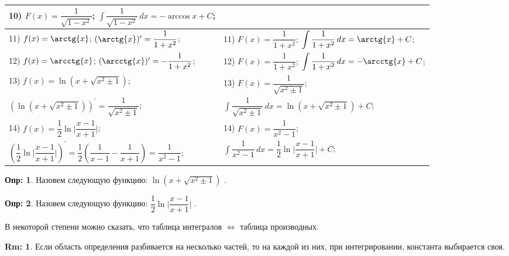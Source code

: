 \documentclass[12pt]{article}
\theoremstyle{definition}
\newtheorem{defn}{Опр:}
\newtheorem{rem}{Rm:}
\DeclareMathOperator{\dint}{\displaystyle\int}
\begin{document}
\begin{tabular}{|p{}|p{}|}
	\rule{0pt}{4.2ex}10) $F(x) = \dfrac{1}{\sqrt{1-x^2}}$; $\dint \dfrac{1}{\sqrt{1-x^2}} \, dx = -\arccos{x} + C$;
	\\[2ex]\hline
	\rule{0pt}{4.2ex}11) $f(x) = \arctg{x}$; $(\arctg{x})^\prime = \dfrac{1}{1 + x^2}$; & 
	\rule{0pt}{4.2ex}11) $F(x) = \dfrac{1}{1 + x^2}$; $\dint \dfrac{1}{1 + x^2} \, dx = \arctg{x} + C$;
	\\[2ex]\hline
	\rule{0pt}{4.2ex}12) $f(x) = \arcctg{x}$; $(\arcctg{x})^\prime = -\dfrac{1}{1 + x^2}$; & 
	\rule{0pt}{4.2ex}12) $F(x) = \dfrac{1}{1 + x^2}$; $\dint \dfrac{1}{1 + x^2} \, dx = -\arcctg{x} + C$;
	\\[2ex]\hline
	
	\rule{0pt}{4.2ex}13) $f(x) = \ln\left(x+\sqrt{x^2\pm 1}\right)$; & 
	\rule{0pt}{4.2ex}13) $F(x) = \dfrac{1}{\sqrt{x^2\pm 1}}$; 
	\\[2ex]
	\vphantom{13)} $\left(\ln\left(x+\sqrt{x^2\pm 1}\right)\right)^\prime =\dfrac{1}{\sqrt{x^2\pm 1}}$; &
	\vphantom{13)} $\dint \dfrac{1}{\sqrt{x^2\pm 1}} \, dx = \ln\left(x+\sqrt{x^2\pm 1}\right) + C$;
	\\[2ex]\hline
	
	\rule{0pt}{4.2ex}14) $f(x) = \dfrac{1}{2}\ln \bigg|\dfrac{x-1}{x+1}\bigg|$; & 
	\rule{0pt}{4.2ex}14) $F(x) = \dfrac{1}{x^2-1}$; 
	\\[2ex]
	\vphantom{14)} $\left(\dfrac{1}{2}\ln \bigg|\dfrac{x-1}{x+1}\bigg|\right)^\prime =\dfrac{1}{2}\left(\dfrac{1}{x-1} - \dfrac{1}{x+1} \right) = \dfrac{1}{x^2-1}$; &
	\vphantom{14)} $\dint \dfrac{1}{x^2-1} \, dx = \dfrac{1}{2}\ln \bigg|\dfrac{x-1}{x+1}\bigg| + C$;
	\\[2ex]\hline
\end{tabular}

\newpage
\begin{defn}
	Назовем следующую функцию: $\ln\left(x+\sqrt{x^2\pm 1}\right)$ .
\end{defn}

\begin{defn}
	Назовем следующую функцию: $\dfrac{1}{2}\ln \bigg|\dfrac{x-1}{x+1}\bigg|$ .
\end{defn}

В некоторой степени можно сказать, что таблица интегралов $\Leftrightarrow$ таблица производных.

\begin{rem}
	Если область определения разбивается на несколько частей, то на каждой из них, при интегрировании, константа выбирается своя.
\end{rem}
\end{document}
